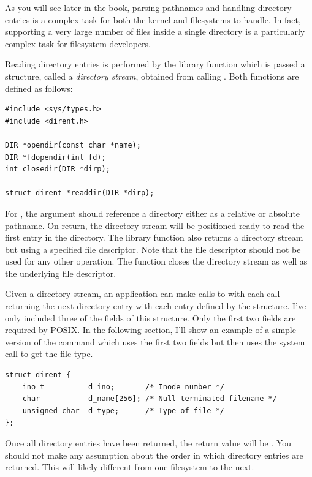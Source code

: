 As you will see later in the book, parsing pathnames and handling directory entries is a complex task for both the kernel and filesystems to handle. In fact, supporting a very large number of files inside a single directory is a particularly complex task for filesystem developers.

Reading directory entries is performed by the  library function which is passed a  structure, called a \textit{directory stream}, obtained from calling . Both functions are defined as follows:

\begin{lstlisting}
#include <sys/types.h>
#include <dirent.h>

DIR *opendir(const char *name);
DIR *fdopendir(int fd);
int closedir(DIR *dirp);

struct dirent *readdir(DIR *dirp);
\end{lstlisting}

\noindent
For , the  argument should reference a directory either as a relative or absolute pathname. On return, the directory stream will be positioned ready to read the first entry in the directory. The  library function also returns a directory stream but using a specified file descriptor. Note that the file descriptor should not be used for any other operation. The  function closes the directory stream as well as the underlying file descriptor.

Given a directory stream, an application can make calls to  with each call returning the next directory entry with each entry defined by the  structure. I've only included three of the fields of this structure. Only the first two fields are required by POSIX. In the following section, I'll show an example of a simple version of the  command which uses the first two fields but then uses the  system call to get the file type.

\begin{lstlisting}
struct dirent {
    ino_t          d_ino;       /* Inode number */
    char           d_name[256]; /* Null-terminated filename */
    unsigned char  d_type;      /* Type of file */
};
\end{lstlisting}

\noindent
Once all directory entries have been returned, the return value will be . You should not make any assumption about the order in which directory entries are returned. This will likely different from one filesystem to the next. 

